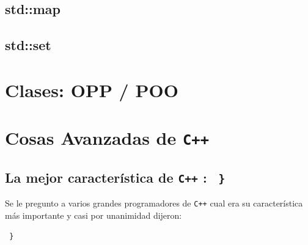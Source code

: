 \documentclass[12pt, fleqn]{report}                             %
\theoremstyle{break}                                            %
\newcommand \Cpp  {\texttt{C++} }                               %
\begin{document}
        \section{std::map}

        \section{std::set}


    \clearpage
    \chapter{Clases: OPP / POO}


    \clearpage
    \chapter{Cosas Avanzadas de \Cpp}

        \section{La mejor característica de \Cpp: \texttt{ \} } }     
        
            Se le pregunto a varios grandes programadores de \Cpp cual era su
            característica más importante y casi por unanimidad dijeron:

            \texttt{ \} }
\end{document}
